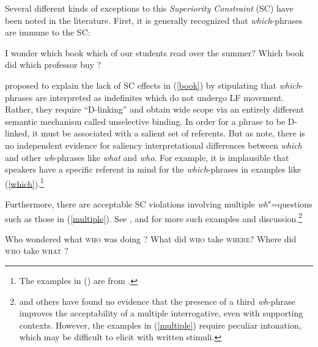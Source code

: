 \documentclass[output=paper,biblatex,babelshorthands,newtxmath,draftmode,colorlinks,citecolor=brown]{langscibook}
\begin{document}
\eal  \label{badsc2}
\zl

Several different kinds of exceptions to this \emph{Superiority Constraint} (SC) have been 
noted in the literature. First, it is generally recognized that \emph{which}-phrases are
immune to the SC:

\eal \label{book}
\ex I wonder which book which of our students read \spc over the summer?
\ex Which book did which professor buy \spc?
\zl

\noindent
\citet{pesetskydlink} proposed to explain the lack of SC effects in (\ref{book}) by stipulating that
\emph{which}-phrases are interpreted as indefinites which do not undergo LF movement. Rather, they
require ``D-linking'' and obtain wide scope via an entirely different semantic mechanism called
unselective binding. In order for a phrase to be D-linked, it must be associated with a salient set
of referents. But as \citet[248]{ginzsag} note, there is no independent evidence for saliency
interpretational differences between \emph{which} and other \emph{wh}-phrases like \emph{what} and
\emph{who}. For example, it is implausible that speakers have a specific referent in mind for the
\emph{which}-phrases in examples like (\ref{which}).\footnote{
The examples in () are from .}

\eal  \label{which}
\zl



Furthermore, there are acceptable SC violations involving multiple \emph{wh}"=questions such as
those in (\ref{multiple}). See \citet{Bolinger78}, \citet{kayne83} and \citet[109]{pesetskydlink}
for more such examples and discussion.\footnote{\citet{gibson10} and others have found no evidence
  that the presence of a third \emph{wh}-phrase improves the acceptability of a multiple
  interrogative, even with supporting contexts. However, the examples in (\ref{multiple}) require
  peculiar intonation, which may be difficult to elicit with written stimuli.}

\eal \label{multiple}
\ex Who wondered what \textsc{who} was doing \spc?
\ex What did \textsc{who} take \spcs \textsc{where}?
\ex Where did \textsc{who} take \textsc{what} \spc?
\zl
\end{document}
